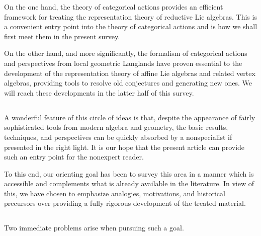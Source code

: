 \documentclass[10pt]{amsart}
\theoremstyle{remark}
\numberwithin{equation}{section}
\begin{document}
	
	On the one hand, the theory of categorical actions provides an efficient 
	framework for treating the representation theory of reductive Lie algebras. 
	This is a convenient entry point into the 
	theory of categorical actions 
	and is how we shall first meet them in the present survey. 
	
	On the other hand, and more significantly, the formalism of categorical 
	actions and perspectives from local geometric Langlands have proven 
	essential to the development of the representation theory of 
	affine Lie algebras and related vertex algebras, providing tools to 
	resolve old conjectures and generating new ones. We will reach these developments in the 
	latter half of this survey. 
	
	
	
	
	

	\subsection{} 	
	
	A wonderful feature of this circle of ideas is that, despite the appearance 
	of fairly sophisticated tools from modern algebra and geometry, the basic 
	results, techniques, and perspectives can be quickly 
	absorbed by a nonspecialist if presented in the right light. It is our 
	hope that the present article can provide such an entry point for 
	the nonexpert reader. 
	
	
	To this end, our orienting goal has been to 
	survey this area in 
	a manner which is accessible and complements what 
	is already available in the literature. In view of this, we 
	have chosen to emphasize analogies, motivations, and historical precursors 
	over providing a fully rigorous development of the treated material. 
	
   \subsection{} Two immediate 
	problems 
	 arise when 
	pursuing such a goal. 
	
\end{document}
